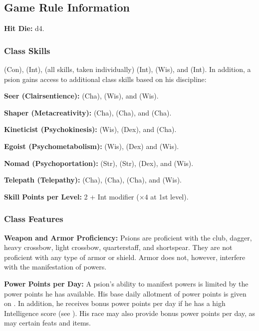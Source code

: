 \subsection{Game Rule Information}

\textbf{Hit Die:} d4.

\subsubsection{Class Skills}

 (Con),  (Int),  (all skills, taken individually) (Int),  (Wis), and  (Int). In addition, a psion gains access to additional class skills based on his discipline:

\textbf{Seer (Clairsentience):}  (Cha),  (Wis), and  (Wis).

\textbf{Shaper (Metacreativity):}  (Cha),  (Cha), and  (Cha).

\textbf{Kineticist (Psychokinesis):}  (Wis),  (Dex), and  (Cha).

\textbf{Egoist (Psychometabolism):}  (Wis),  (Dex) and  (Wis).

\textbf{Nomad (Psychoportation):}  (Str),  (Str),  (Dex), and  (Wis).

\textbf{Telepath (Telepathy):}  (Cha),  (Cha),  (Cha), and  (Wis).

\textbf{Skill Points per Level:} 2 + Int modifier ($\times 4$ at 1st level).

\subsubsection{Class Features}

\textbf{Weapon and Armor Proficiency:} Psions are proficient with the club, dagger, heavy crossbow, light crossbow, quarterstaff, and shortspear. They are not proficient with any type of armor or shield. Armor does not, however, interfere with the manifestation of powers.

\textbf{Power Points per Day:} A psion's ability to manifest powers is limited by the power points he has available. His base daily allotment of power points is given on . In addition, he receives bonus power points per day if he has a high Intelligence score (see ). His race may also provide bonus power points per  day, as may certain feats and items.

